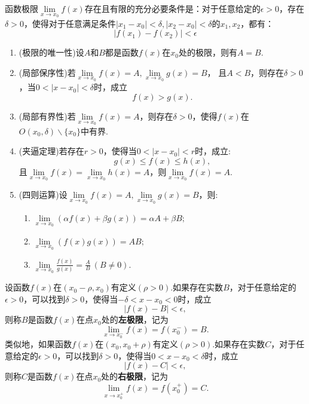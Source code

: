 	\begin{theorem}[Cauchy收敛原理]
		函数极限$\lim\limits_{x\rightarrow x_0}f(x)$存在且有限的充分必要条件是：对于任意给定的$\epsilon>0$，存在$\delta>0$，使得对于任意满足条件$|x_{1}-x_{0}|<\delta,|x_{2}-x_{0}|<\delta$的$x_{1},x_{2}$，都有：$$|f(x_{1})-f(x_{2})|<\epsilon$$
	\end{theorem}
	\begin{property}[函数极限的性质]
		\begin{enumerate}
			\item (极限的唯一性)设$A$和$B$都是函数$f(x)$在$x_0$处的极限，则有$A=B$.
			\item (局部保序性)若$\lim\limits_{x\rightarrow x_0}f(x)=A,\lim\limits_{x\rightarrow x_0}g(x)=B$，
			且$A<B$，则存在$\delta>0$，当$0<|x-x_0|<\delta$时，成立$$f(x)>g(x).$$
			\item (局部有界性)若$\lim\limits_{x\rightarrow x_0}f(x)=A$，则存在$\delta>0$，使得$f(x)$在$O(x_0,\delta)\backslash\{x_0\}$中有界.
			\item (夹逼定理)若存在$r>0$，使得当$0<|x-x_0|<r$时，成立:$$g(x)\leq f(x)\leq h(x),$$且$\lim\limits_{x\rightarrow x_0}f(x)=\lim\limits_{x\rightarrow x_0}h(x)=A$，则$\lim\limits_{x\rightarrow x_0}f(x)=A$.
			\item (四则运算)设$\lim\limits_{x\rightarrow x_0}f(x)=A,\lim\limits_{x\rightarrow x_0}g(x)=B$，则:
					\begin{enumerate}
						\item $\lim\limits_{x\rightarrow x_0}(\alpha f(x)+\beta g(x))=\alpha A+\beta B;$
						\item $\lim\limits_{x\rightarrow x_0}(f(x)g(x))=AB;$
						\item $\lim\limits_{x\rightarrow x_0}\frac{f(x)}{g(x)}=\frac{A}{B}\ (B\neq0).$
					\end{enumerate}
		\end{enumerate}
	\end{property}
	\begin{definition}[单侧极限]
		设函数$f(x)$在$(x_0-\rho,x_0)$有定义$(\rho>0)$.如果存在实数$B$，对于任意给定的$\epsilon>0$，可以找到$\delta>0$，使得当$-\delta<x-x_0<0$时，成立$$|f(x)-B|<\epsilon,$$则称$B$是函数$f(x)$在点$x_0$处的\textbf{左极限}，记为$$\lim\limits_{x\rightarrow x_0^{-}}f(x)=f(x_0^{-})=B.$$
		类似地，如果函数$f(x)$在$(x_0,x_0+\rho)$有定义$(\rho>0)$.如果存在实数$C$，对于任意给定的$\epsilon>0$，可以找到$\delta>0$，使得当$0<x-x_0<\delta$时，成立$$|f(x)-C|<\epsilon,$$则称$C$是函数$f(x)$在点$x_0$处的\textbf{右极限}，记为$$\lim\limits_{x\rightarrow x_0^{+}}f(x)=f(x_0^{+})=C.$$
	\end{definition}

